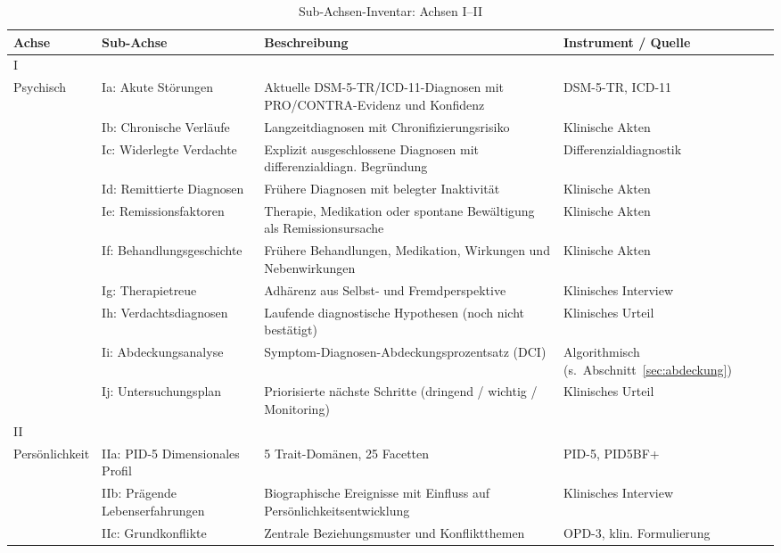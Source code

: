 \documentclass[11pt,a4paper]{article}
\newenvironment{CompactLongTable}{%
  \begingroup
  \footnotesize
  \setstretch{1.0}%
  \setlength{\LTpre}{0pt}%
  \setlength{\LTpost}{0pt}%
}{%
  \endgroup
}
\begin{document}
\begin{table}[H]
\centering
\caption{Sub-Achsen-Inventar: Achsen I--II}
\label{tab:subaxes_part1}
\begin{CompactLongTable}
\begin{tabular}{@{}L{1.8cm}L{2.4cm}L{5.0cm}L{4.0cm}@{}}
\toprule
\textbf{Achse} & \textbf{Sub-Achse} & \textbf{Beschreibung} & \textbf{Instrument / Quelle} \\
\midrule
I\\Psychisch & Ia: Akute St\"orungen & Aktuelle DSM-5-TR/ICD-11-Diagnosen mit PRO/CONTRA-Evidenz und Konfidenz & DSM-5-TR, ICD-11 \\
 & Ib: Chronische Verl\"aufe & Langzeitdiagnosen mit Chronifizierungsrisiko & Klinische Akten \\
 & Ic: Widerlegte Verdachte & Explizit ausgeschlossene Diagnosen mit differenzialdiagn. Begr\"undung & Differenzialdiagnostik \\
 & Id: Remittierte Diagnosen & Fr\"uhere Diagnosen mit belegter Inaktivit\"at & Klinische Akten \\
 & Ie: Remissionsfaktoren & Therapie, Medikation oder spontane Bew\"altigung als Remissionsursache & Klinische Akten \\
 & If: Behandlungsgeschichte & Fr\"uhere Behandlungen, Medikation, Wirkungen und Nebenwirkungen & Klinische Akten \\
 & Ig: Therapietreue & Adh\"arenz aus Selbst- und Fremdperspektive & Klinisches Interview \\
 & Ih: Verdachtsdiagnosen & Laufende diagnostische Hypothesen (noch nicht best\"atigt) & Klinisches Urteil \\
 & Ii: Abdeckungsanalyse & Symptom-Diagnosen-Abdeckungsprozentsatz (DCI) & Algorithmisch (s.\ Abschnitt~\ref{sec:abdeckung}) \\
 & Ij: Untersuchungsplan & Priorisierte n\"achste Schritte (dringend / wichtig / Monitoring) & Klinisches Urteil \\
\midrule
II\\Pers\"onlichkeit & IIa: PID-5 Dimensionales Profil & 5 Trait-Dom\"anen, 25 Facetten & PID-5, PID5BF+ \\
 & IIb: Pr\"agende Lebenserfahrungen & Biographische Ereignisse mit Einfluss auf Pers\"onlichkeitsentwicklung & Klinisches Interview \\
 & IIc: Grundkonflikte & Zentrale Beziehungsmuster und Konfliktthemen & OPD-3, klin. Formulierung \\
\bottomrule
\end{tabular}
\end{CompactLongTable}
\end{table}
\end{document}
